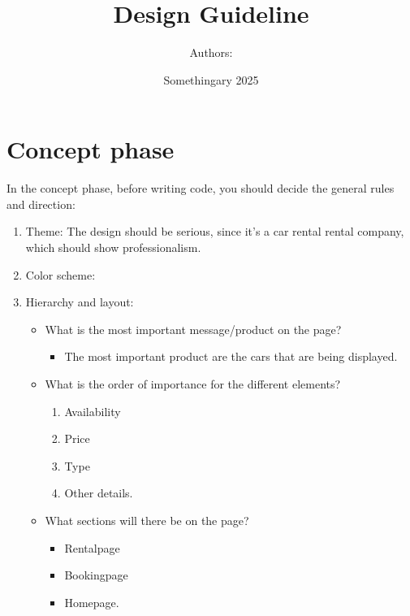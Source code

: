 \documentclass{article}
\title{Design Guideline}
\author{Authors: }
\date{Somethingary 2025}
\begin{document}
\maketitle

\newpage
\section{Concept phase}
In the concept phase, before writing code, you should decide the general rules and direction:
\begin{enumerate}
    \item Theme: The design should be serious, since it's a car rental rental company, which should show professionalism.
    \item Color scheme:
    \item Hierarchy and layout:
    \begin{itemize}
        \item What is the most important message/product on the page?
        \begin{itemize}
            \item The most important product are the cars that are being displayed.
        \end{itemize}
        \item What is the order of importance for the different elements?
        \begin{enumerate}
            \item Availability
            \item Price
            \item Type
            \item Other details.
        \end{enumerate}
        \item What sections will there be on the page?
        \begin{itemize}
            \item Rentalpage
            \item Bookingpage
            \item Homepage.

\end{itemize}
\end{itemize}
\end{enumerate}
\end{document}
